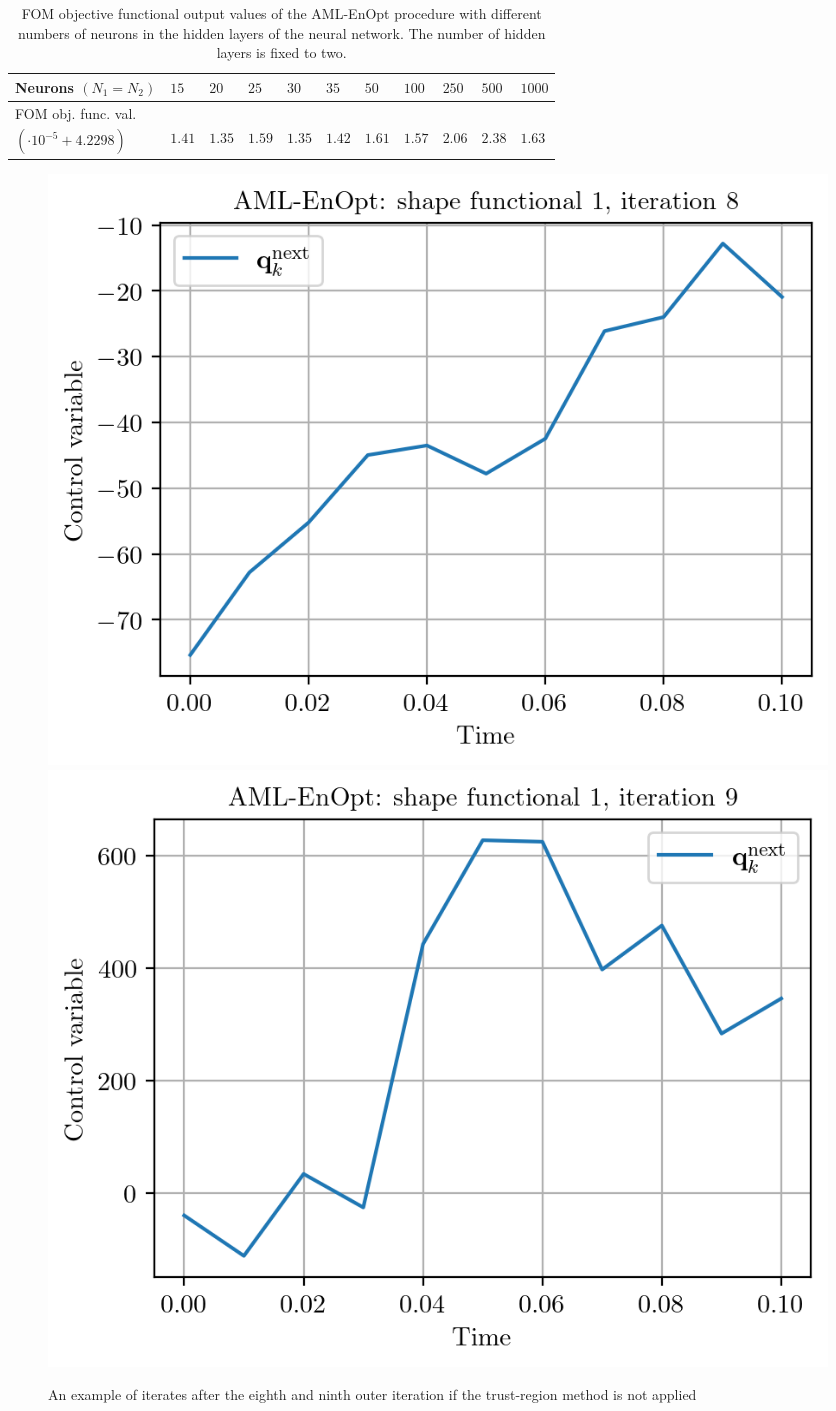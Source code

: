 \begin{table}[h]
\caption{\label{DNNStructFOMComparison} FOM objective functional output values of the AML-EnOpt procedure with different numbers of neurons in the hidden layers of the neural network. The number of hidden layers is fixed to two.}
\centering
\begin{tabular}{|l|llllllllll|}
\hline
Neurons $(N_1=N_2)$& $15$ & $20$ & $25$ & $30$ & $35$ & $50$ & $100$ & $250$ & $500$ & $1000$\\
\hline
FOM obj. func. val.&&&&&&&&&&\\
$(\cdot 10^{-5}+4.2298)$& $1.41$ & $1.35$ & $1.59$ & $1.35$ & $1.42$ & $1.61$ & $1.57$ & $2.06$ & $2.38$ & $1.63$\\
\hline
\end{tabular}
\end{table}

\begin{figure}
\centering
\includegraphics{Plots/noTRIteration8.png}
\includegraphics{Plots/noTRIteration9.png}
\caption{\label{noTRResults}An example of iterates after the eighth and ninth outer iteration if the trust-region method is not applied}
\end{figure}